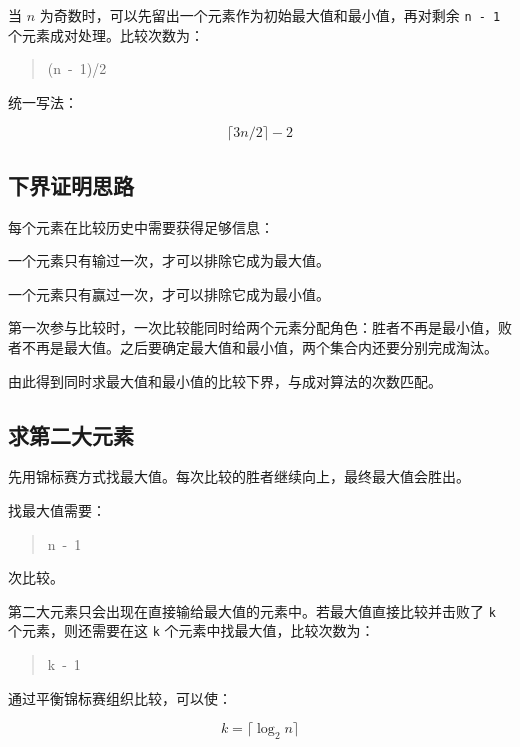 \documentclass[UTF8,zihao=-4]{ctexart}
\begin{document}
当 $n$ 为奇数时，可以先留出一个元素作为初始最大值和最小值，再对剩余 \texttt{n - 1} 个元素成对处理。比较次数为：

\begin{quote}
\small\ttfamily\raggedright
{}(n\ -\ 1)/2\\
\end{quote}

统一写法：

\[\lceil 3n/2 \rceil - 2\]

\subsection*{下界证明思路}

每个元素在比较历史中需要获得足够信息：

一个元素只有输过一次，才可以排除它成为最大值。

一个元素只有赢过一次，才可以排除它成为最小值。

第一次参与比较时，一次比较能同时给两个元素分配角色：胜者不再是最小值，败者不再是最大值。之后要确定最大值和最小值，两个集合内还要分别完成淘汰。

由此得到同时求最大值和最小值的比较下界，与成对算法的次数匹配。

\subsection*{求第二大元素}

先用锦标赛方式找最大值。每次比较的胜者继续向上，最终最大值会胜出。

找最大值需要：

\begin{quote}
\small\ttfamily\raggedright
\relax n\ -\ 1\\
\end{quote}

次比较。

第二大元素只会出现在直接输给最大值的元素中。若最大值直接比较并击败了 \texttt{k} 个元素，则还需要在这 \texttt{k} 个元素中找最大值，比较次数为：

\begin{quote}
\small\ttfamily\raggedright
\relax k\ -\ 1\\
\end{quote}

通过平衡锦标赛组织比较，可以使：

\[k = \lceil \log_2 n \rceil\]
\end{document}
